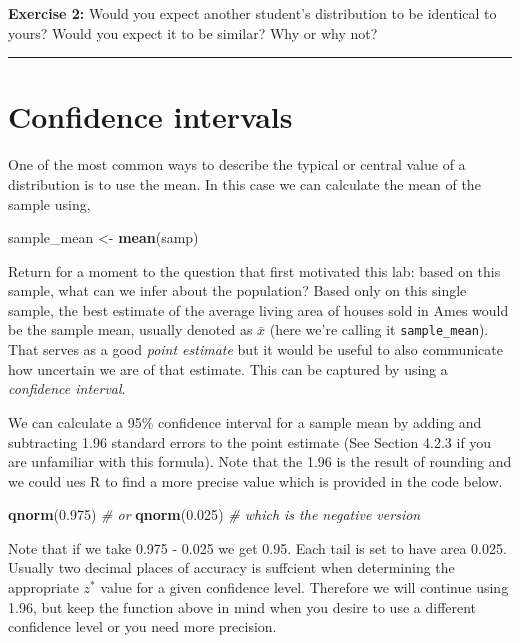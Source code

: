\documentclass[]{book}
\newenvironment{Shaded}{\begin{snugshade}}{\end{snugshade}}
\newcommand{\KeywordTok}[1]{\textcolor[rgb]{0.13,0.29,0.53}{\textbf{#1}}}
\newcommand{\FloatTok}[1]{\textcolor[rgb]{0.00,0.00,0.81}{#1}}
\newcommand{\StringTok}[1]{\textcolor[rgb]{0.31,0.60,0.02}{#1}}
\newcommand{\CommentTok}[1]{\textcolor[rgb]{0.56,0.35,0.01}{\textit{#1}}}
\newcommand{\NormalTok}[1]{#1}
\theoremstyle{definition}
\theoremstyle{definition}
\theoremstyle{definition}
\theoremstyle{remark}
\begin{document}
\textbf{Exercise 2:} Would you expect another student's distribution to
be identical to yours? Would you expect it to be similar? Why or why
not?

\begin{center}\rule{0.5\linewidth}{\linethickness}\end{center}

\section{Confidence intervals}\label{confidence-intervals}

One of the most common ways to describe the typical or central value of
a distribution is to use the mean. In this case we can calculate the
mean of the sample using,

\begin{Shaded}
\begin{Highlighting}[]
\NormalTok{sample_mean <-}\StringTok{ }\KeywordTok{mean}\NormalTok{(samp)}
\end{Highlighting}
\end{Shaded}

Return for a moment to the question that first motivated this lab: based
on this sample, what can we infer about the population? Based only on
this single sample, the best estimate of the average living area of
houses sold in Ames would be the sample mean, usually denoted as
\(\bar{x}\) (here we're calling it \texttt{sample\_mean}). That serves
as a good \emph{point estimate} but it would be useful to also
communicate how uncertain we are of that estimate. This can be captured
by using a \emph{confidence interval}.

We can calculate a 95\% confidence interval for a sample mean by adding
and subtracting 1.96 standard errors to the point estimate (See Section
4.2.3 if you are unfamiliar with this formula). Note that the 1.96 is
the result of rounding and we could ues R to find a more precise value
which is provided in the code below.

\begin{Shaded}
\begin{Highlighting}[]
\KeywordTok{qnorm}\NormalTok{(}\FloatTok{0.975}\NormalTok{) }\CommentTok{# or}
\KeywordTok{qnorm}\NormalTok{(}\FloatTok{0.025}\NormalTok{) }\CommentTok{# which is the negative version}
\end{Highlighting}
\end{Shaded}

Note that if we take 0.975 - 0.025 we get 0.95. Each tail is set to have
area 0.025. Usually two decimal places of accuracy is suffcient when
determining the appropriate \(z^*\) value for a given confidence level.
Therefore we will continue using 1.96, but keep the function above in
mind when you desire to use a different confidence level or you need
more precision.
\end{document}
